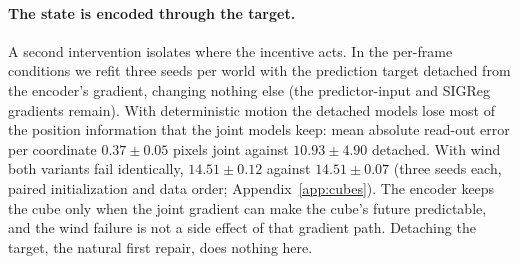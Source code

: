 \paragraph{The state is encoded through the target.}
A second intervention isolates where the incentive acts. In the per-frame conditions we refit
three seeds per world with the prediction target detached from the encoder's gradient, changing
nothing else (the predictor-input and SIGReg gradients remain). With deterministic motion the
detached models lose most of the position information that the joint models keep: mean absolute
read-out error per coordinate $0.37\pm0.05$ pixels joint against $10.93\pm4.90$ detached. With
wind both variants fail identically, $14.51\pm0.12$ against $14.51\pm0.07$ (three seeds each,
paired initialization and data order; Appendix~\ref{app:cubes}). The encoder keeps the cube only
when the joint gradient can make the cube's future predictable, and the wind failure is not a side
effect of that gradient path. Detaching the target, the natural first repair, does nothing here.

\begin{table}[t]
\centering
\caption{\textbf{One pixel policy, four worlds, two imaginations.} Survival and control length
(of 121 possible steps) over 256 paired evaluation episodes, mean $\pm$ sample standard deviation
over three policy seeds. ``Imagined $r$'': reward per step paid by the model at the last training
update; the true reward is never positive. ``Real'' rows train on real transitions seen through
each model's decoder. State-blind rules through the same evaluator: left--right alternation survives
the still world in every episode; both rules survive no episode of the wind worlds or the gate,
lasting 17--18 and 24 control steps (Appendix~\ref{app:shared-cnn}).}
\label{tab:shared-cnn}
\small
{}
\end{table}

